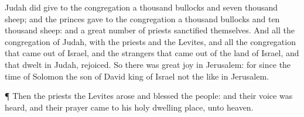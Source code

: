 {Judah did
give to the
congregation a
thousand
bullocks and
seven
thousand
sheep; and the
princes
gave to the
congregation a
thousand
bullocks and
ten
thousand
sheep: and a great
number of
priests
sanctified themselves.
And all the
congregation of
Judah, with the
priests and the
Levites, and all the
congregation that came
out of
Israel, and the
strangers that came
out of the
land of
Israel, and that
dwelt in
Judah,
rejoiced.
So there was
great
joy in
Jerusalem: for since the
time of
Solomon the
son of
David
king of
Israel
{} not the like in
Jerusalem.
\par }{\PP {}¶ Then the
priests the
Levites
arose and
blessed the
people: and their
voice was
heard, and their
prayer
came
{} to his
holy dwelling
place,
{} unto
heaven.

}

